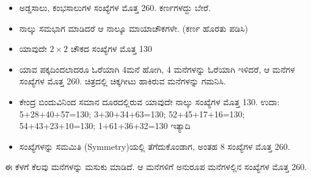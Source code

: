 \begin{itemize}
	\item ಅಡ್ಡಸಾಲು, ಕಂಭಸಾಲುಗಳ ಸಂಖ್ಯೆಗಳ ಮೊತ್ತ 260. ಕರ್ಣಗಳದ್ದು ಬೇರೆ.
	\item ನಾಲ್ಕು ಸಮಭಾಗ ಮಾಡಿದರೆ ಆ ನಾಲ್ಕೂ ಮಾಯಾಚೌಕಗಳೇ. (ಕರ್ಣ ಹೊರತು ಪಡಿಸಿ)
	\item ಯಾವುದೇ $2 \times 2$ ಚೌಕದ ಸಂಖ್ಯೆಗಳ ಮೊತ್ತ 130
	\item ಯಾವ ಪಕ್ಕದಿಂದಲಾದರೂ ಓರೆಯಾಗಿ 4ಮನೆ ಹೋಗಿ, 4 ಮನೆಗಳನ್ನು ಓರೆ\-ಯಾಗಿ ಇಳಿದರೆ, ಆ ಮನೆಗಳ ಸಂಖ್ಯೆಗಳ ಮೊತ್ತ 260. ಚಿತ್ರದಲ್ಲಿ ಚಿಕ್ಕಗೀಟು ಹಾಕಿರುವ ಮನೆಗಳನ್ನು ಗಮನಿಸಿ.
	\item ಕೇಂದ್ರ ಬಿಂದುವಿನಿಂದ ಸಮಾನ ದೂರದಲ್ಲಿರುವ ಯಾವುದೇ ನಾಲ್ಕು ಸಂಖ್ಯೆಗಳ ಮೊತ್ತ 130. ಉದಾ: 5+28+40+57=130; 3+30+34+63=130; 52+45+17+16=130; 54+43+23+10=130; 1+61+36+32=130 ಇತ್ಯಾದಿ
	\item ಸಂಖ್ಯೆಗಳನ್ನು ಸಮಮಿತಿ (Symmetry)ಯಲ್ಲಿ ತೆಗೆದುಕೊಂಡಾಗ, ಅಂತಹ 8 ಸಂಖ್ಯೆಗಳ ಮೊತ್ತ 260.
\end{itemize}
ಈ ಕೆಳಗೆ ಕೆಲವು ಮನೆಗಳನ್ನು ಮಸುಕು ಮಾಡಿದೆ. ಆ ಮನೆಗಳಿಗೆ ಅನುರೂಪ ಮನೆಗಳಲ್ಲಿನ ಸಂಖ್ಯೆಗಳ ಮೊತ್ತ 260.
